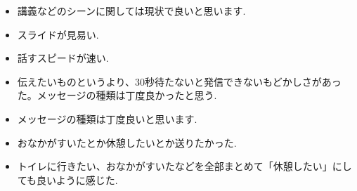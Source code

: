 \documentclass{funthesis}
\begin{document}
\begin{itemize}
 \item 講義などのシーンに関しては現状で良いと思います.\\
 \item スライドが見易い.\\
 \item 話すスピードが速い.\\
 \item 伝えたいものというより、30秒待たないと発信できないもどかしさがあった。メッセージの種類は丁度良かったと思う.\\
 \item メッセージの種類は丁度良いと思います.\\
 \item おなかがすいたとか休憩したいとか送りたかった.\\
 \item トイレに行きたい、おなかがすいたなどを全部まとめて「休憩したい」にしても良いように感じた.\\
\end{itemize}
\end{document}
